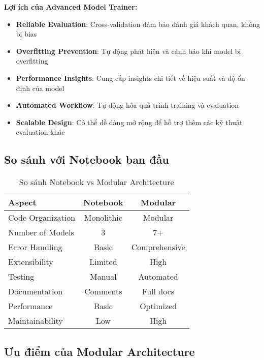 \textbf{Lợi ích của Advanced Model Trainer:}

\begin{itemize}
    \item \textbf{Reliable Evaluation}: Cross-validation đảm bảo đánh giá khách quan, không bị bias
    \item \textbf{Overfitting Prevention}: Tự động phát hiện và cảnh báo khi model bị overfitting
    \item \textbf{Performance Insights}: Cung cấp insights chi tiết về hiệu suất và độ ổn định của model
    \item \textbf{Automated Workflow}: Tự động hóa quá trình training và evaluation
    \item \textbf{Scalable Design}: Có thể dễ dàng mở rộng để hỗ trợ thêm các kỹ thuật evaluation khác
\end{itemize}

\subsection{So sánh với Notebook ban đầu}

\begin{table}[H]
\centering
\begin{tabular}{|l|c|c|}
\hline
\textbf{Aspect} & \textbf{Notebook} & \textbf{Modular} \\
\hline
Code Organization & Monolithic & Modular \\
\hline
Number of Models & 3 & 7+ \\
\hline
Error Handling & Basic & Comprehensive \\
\hline
Extensibility & Limited & High \\
\hline
Testing & Manual & Automated \\
\hline
Documentation & Comments & Full docs \\
\hline
Performance & Basic & Optimized \\
\hline
Maintainability & Low & High \\
\hline
\end{tabular}
\caption{So sánh Notebook vs Modular Architecture}
\end{table}

\subsection{Ưu điểm của Modular Architecture}

